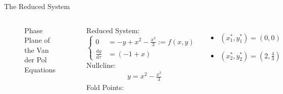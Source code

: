 \documentclass[11pt]{beamer}
\newcommand{\dif}{\mathrm{d}}
\begin{document}
\begin{frame}{The Reduced System}
\begin{columns}
\begin{figure}
    \centering
{}
    \caption{Phase Plane of the Van der Pol Equations}
\end{figure}
Reduced System:
\begin{equation*} 
        \begin{cases}
        0 &= -y + x^2 - \frac{x^3}{3} := f(x,y)\\ 
        \frac{\dif y}{\dif \tau}&= (-1+x)
        \end{cases}
        \end{equation*}
\newline
Nullcline:
\begin{align*}
 &y = x^2 - \frac{x^3}{3}
\end{align*}
\newline
\newline
Fold Points:
\begin{itemize}
\item$(x_1^*,y_1^*)= (0,0) $

\item$(x_2^*,y_2^*)=(2,\frac{4}{3})$
\end{itemize}


\end{columns}
\end{frame}
\end{document}

